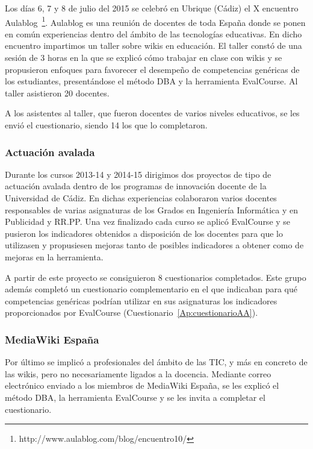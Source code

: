 		Los días 6, 7 y 8 de julio del 2015 se celebró en Ubrique (Cádiz) el X encuentro Aulablog~\footnote{http://www.aulablog.com/blog/encuentro10/}. Aulablog es una reunión de docentes de toda España donde se ponen en común experiencias  dentro del ámbito de las tecnologías educativas. En dicho encuentro impartimos un taller sobre wikis en educación. El taller constó de una sesión de 3 horas en la que se explicó cómo trabajar en clase con wikis y se propusieron enfoques para favorecer el desempeño de competencias genéricas de los estudiantes, presentándose el método DBA y la herramienta EvalCourse. Al taller asistieron 20 docentes.

A los asistentes al taller, que fueron docentes de varios niveles educativos, se les envió el cuestionario, siendo 14 los que lo completaron.

	\subsubsection{Actuación avalada}

		Durante los cursos 2013-14 y 2014-15 dirigimos dos proyectos de tipo de actuación avalada dentro de los programas de innovación docente de la Universidad de Cádiz. En dichas experiencias colaboraron varios docentes responsables de varias asignaturas de los Grados en Ingeniería Informática y en Publicidad y RR.PP. Una vez finalizado cada curso se aplicó EvalCourse y se pusieron los indicadores obtenidos a disposición de los docentes para que lo utilizasen y propusiesen mejoras tanto de posibles indicadores a obtener como de mejoras en la herramienta.

A partir de este proyecto se consiguieron 8 cuestionarios completados. Este grupo además completó un cuestionario complementario en el que indicaban para qué competencias genéricas podrían utilizar en sus asignaturas los indicadores proporcionados por EvalCourse (Cuestionario~\ref{Ap:cuestionarioAA}).

	\subsubsection{MediaWiki España}

	Por último se implicó a profesionales del ámbito de las TIC, y más en concreto de las wikis, pero no necesariamente ligados a la docencia. Mediante correo electrónico enviado a los miembros de MediaWiki España, se les explicó el método DBA, la herramienta EvalCourse y se les invita a completar el cuestionario.		

